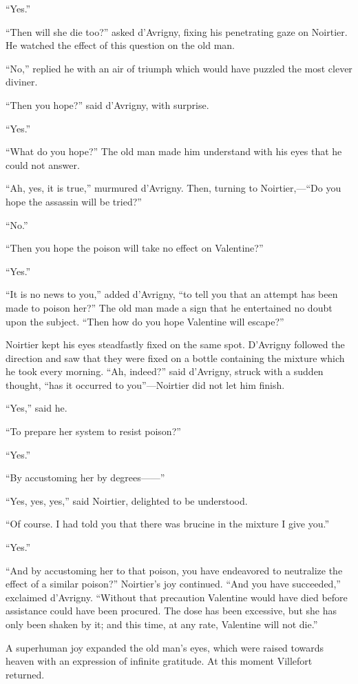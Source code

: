 “Yes.”

“Then will she die too?” asked d’Avrigny, fixing his penetrating gaze
on Noirtier. He watched the effect of this question on the old man.

“No,” replied he with an air of triumph which would have puzzled the
most clever diviner.

“Then you hope?” said d’Avrigny, with surprise.

“Yes.”

“What do you hope?” The old man made him understand with his eyes that
he could not answer.

“Ah, yes, it is true,” murmured d’Avrigny. Then, turning to
Noirtier,—“Do you hope the assassin will be tried?”

“No.”

“Then you hope the poison will take no effect on Valentine?”

“Yes.”

“It is no news to you,” added d’Avrigny, “to tell you that an attempt
has been made to poison her?” The old man made a sign that he
entertained no doubt upon the subject. “Then how do you hope Valentine
will escape?”

Noirtier kept his eyes steadfastly fixed on the same spot. D’Avrigny
followed the direction and saw that they were fixed on a bottle
containing the mixture which he took every morning. “Ah, indeed?” said
d’Avrigny, struck with a sudden thought, “has it occurred to
you”—Noirtier did not let him finish.

“Yes,” said he.

“To prepare her system to resist poison?”

“Yes.”

“By accustoming her by degrees——”

“Yes, yes, yes,” said Noirtier, delighted to be understood.

“Of course. I had told you that there was brucine in the mixture I give
you.”

“Yes.”

“And by accustoming her to that poison, you have endeavored to
neutralize the effect of a similar poison?” Noirtier’s joy continued.
“And you have succeeded,” exclaimed d’Avrigny. “Without that precaution
Valentine would have died before assistance could have been procured.
The dose has been excessive, but she has only been shaken by it; and
this time, at any rate, Valentine will not die.”

A superhuman joy expanded the old man’s eyes, which were raised towards
heaven with an expression of infinite gratitude. At this moment
Villefort returned.

